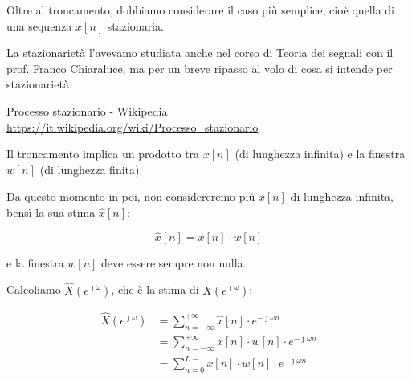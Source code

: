 Oltre al troncamento, dobbiamo considerare il caso più semplice, cioè quella di una sequenza $x \left[ n\right]$ stazionaria. \newline 

\begin{tcolorbox}
    La stazionarietà l'avevamo studiata anche nel corso di Teoria dei segnali con il prof. Franco Chiaraluce, ma per un breve ripasso al volo di cosa si intende per stazionarietà: \newline 

    Processo stazionario - Wikipedia\\
    \url{https://it.wikipedia.org/wiki/Processo_stazionario}
\end{tcolorbox}

Il troncamento implica un prodotto tra $x \left[ n\right]$ (di lunghezza infinita) e la finestra $w \left[ n\right]$ (di lunghezza finita). \newline 

Da questo momento in poi, non considereremo più $x \left[ n\right]$ di lunghezza infinita, bensì la sua stima $\hat{x} \left[ n\right]$: 

{
    \Large 
    \begin{equation}
        \hat{x} \left[ n\right] 
        = 
        x \left[ n\right]
        \cdot 
        w \left[ n\right]
    \end{equation}
}

e la finestra $w \left[ n\right]$ deve essere sempre non nulla. \newline 

Calcoliamo $\hat{X} \left(e^{\jmath \omega}\right)$, che è la stima di $X \left(e^{\jmath \omega}\right)$: 

{
    \Large 
    \begin{equation}
        \begin{split}
            \hat{X} \left(e^{\jmath \omega}\right)
            &= 
            \sum_{n = - \infty}^{+ \infty} 
            \hat{x} \left[ n\right]
            \cdot 
            e^{-\jmath \omega n}
            \\
            &= 
            \sum_{n = - \infty}^{+ \infty} 
            x \left[ n\right]
            \cdot
            w \left[ n\right] 
            \cdot
            e^{-\jmath \omega n}
            \\
            &= 
            \sum_{n = 0}^{L - 1} 
            x \left[ n\right]
            \cdot
            w \left[ n\right] 
            \cdot
            e^{-\jmath \omega n}
        \end{split}
    \end{equation}
}

